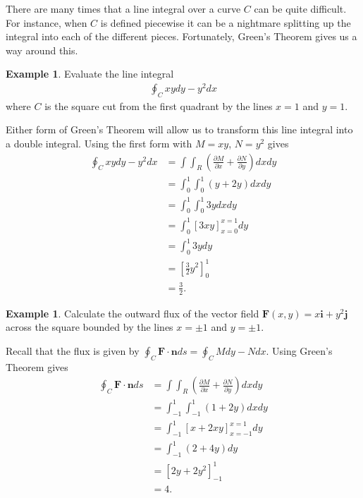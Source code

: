\documentclass[12pt, letter]{article}
\theoremstyle{plain}
\numberwithin{theorem}{section}
\theoremstyle{definition}
\newtheorem{example}[theorem]{Example}
\begin{document}
\bigskip

\hrulefill

\bigskip

There are many times that a line integral over a curve $C$ can be quite difficult. For instance, when $C$ is defined piecewise it can be a nightmare splitting up the integral into each of the different pieces. Fortunately, Green's Theorem gives us a way around this.

\begin{example}
Evaluate the line integral
\begin{align*}
\oint_C xydy-y^2dx
\end{align*}
where $C$ is the square cut from the first quadrant by the lines $x=1$ and $y=1$.

\bigskip

Either form of Green's Theorem will allow us to transform this line integral into a double integral. Using the first form with $M=xy$, $N=y^2$ gives
\begin{align*}
\oint_C xydy-y^2dx &= \int\int_R \left(\frac{\partial M}{\partial x}+\frac{\partial N}{\partial y}\right)dxdy\\
&= \int_0^1\int_0^1 (y+2y)dxdy\\
&= \int_0^1 \int_0^1 3ydxdy\\
&= \int_0^1\left[3xy\right]_{x=0}^{x=1} dy\\
&= \int_0^1 3ydy\\
&= \left[\frac{3}{2}y^2\right]_0^1\\
&= \frac{3}{2}.
\end{align*}
\end{example}

\bigskip

\hrulefill

\bigskip

\begin{example}
Calculate the outward flux of the vector field $\bm{F}(x,y)=x\bm{i}+y^2\bm{j}$ across the square bounded by the lines $x=\pm 1$ and $y=\pm 1$.

\bigskip

Recall that the flux is given by $\oint_C \bm{F}\cdot\bm{n}ds = \oint_C Mdy-Ndx$. Using Green's Theorem gives
\begin{align*}
\oint_C \bm{F}\cdot\bm{n}ds &= \int\int_R \left(\frac{\partial M}{\partial x} + \frac{\partial N}{\partial y}\right)dxdy\\
&=\int_{-1}^1\int_{-1}^1 (1+2y)dxdy\\
&=\int_{-1}^1 \left[x+2xy\right]_{x=-1}^{x=1}dy\\
&=\int_{-1}^1 (2+4y)dy\\
&=\left[ 2y+2y^2\right]_{-1}^1\\
&=4.
\end{align*}
\end{example}
\end{document}
